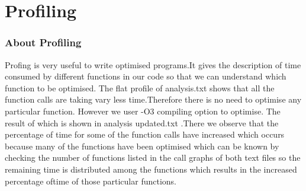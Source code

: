 \documentclass[t,compress,11pt,xcolor=dvipsnames]{beamer}
\begin{document}
\section{Profiling}
\begin{frame}
\frametitle{About Profiling}
Profing is very useful to write optimised programs.It gives the description of time consumed by different functions in our code so that we can understand which function to be optimised.
The flat profile of analysis.txt shows that all the function calls are taking vary less time.Therefore there is no need to optimise any particular function. However we user -O3 compiling option to optimise. The result of which is shown in analysis updated.txt .There we observe that the percentage of time for some of the function calls have increased which occurs because many of the functions have been optimised which can be known by checking the number of functions listed in the call graphs of both text files so the remaining time is distributed among the functions which results in the increased percentage oftime of those particular functions.
\end{frame}
\end{document}
